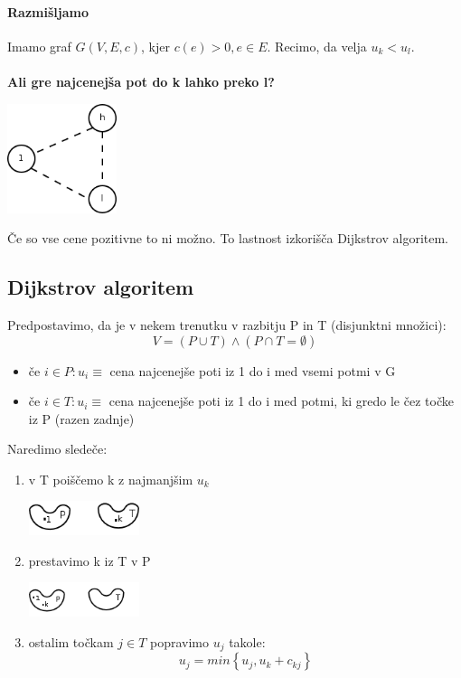 \documentclass[a4paper,10pt]{article}
\begin{document}
\paragraph{Razmi\v sljamo}
Imamo graf $G(V,E,c)$, kjer $c(e) > 0, e \in E$. Recimo, da velja $u_k < u_l$.\\
\\
\textbf{Ali gre najcenej\v sa pot do k lahko preko l?}\\
	\begin{center}
	\includegraphics[width=3.2cm,height=3.2cm]{Slike/DijkstraRazmislek.png}
	\end{center}
\v Ce so vse cene pozitivne to ni mo\v zno. To lastnost izkori\v s\v ca Dijkstrov algoritem.

\subsection{Dijkstrov algoritem}
Predpostavimo, da je v nekem trenutku v razbitju P in T (disjunktni mno\v zici):
$$
V = (P \cup T) \wedge (P \cap T = \emptyset)
$$
\begin{itemize}
\item \v ce $i \in P: u_i \equiv$ cena najcenej\v se poti iz 1 do i med vsemi potmi v G 
\item \v ce $i \in T: u_i \equiv$ cena najcenej\v se poti iz 1 do i med potmi, ki gredo le \v cez to\v cke iz P (razen zadnje)
\end{itemize}

Naredimo slede\v ce:
\begin{enumerate}
\item v T poi\v s\v cemo k z najmanj\v sim $u_k$ \\
	\begin{center}
	\includegraphics[width=3.25cm,height=1cm]{Slike/Dijkstra1.png}
	\end{center}
\item prestavimo k iz T v P \\
	\begin{center}
	\includegraphics[width=3.25cm,height=1cm]{Slike/Dijkstra2.png}
	\end{center}
\item ostalim to\v ckam $j \in T$ popravimo $u_j$ takole:
$$
u_j = min\left\lbrace u_j, u_k + c_{kj} \right\rbrace 
$$
\end{enumerate}
\end{document}
